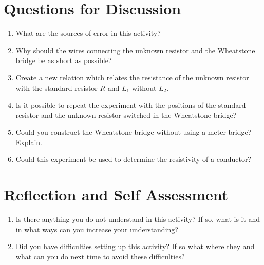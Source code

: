 \section{Questions for Discussion}
\begin{enumerate}
\item What are the sources of error in this activity?
\item Why should the wires connecting the unknown resistor and the Wheatstone bridge be as short as possible?
\item Create a new relation which relates the resistance of the unknown resistor with the standard resistor $R$ and $L_1$ without $L_2$.
\item Is it possible to repeat the experiment with the positions of the standard resistor and the unknown resistor switched in the Wheatstone bridge? 
\item Could you construct the Wheatstone bridge without using a meter bridge? Explain.
\item Could this experiment be used to determine the resistivity of a conductor?
\end{enumerate}

\section{Reflection and Self Assessment}
\begin{enumerate}
\item Is there anything you do not understand in this activity? If so, what is it and in what ways can you increase your understanding?
\item Did you have difficulties setting up this activity? If so what where they and what can you do next time to avoid these difficulties?
\end{enumerate}